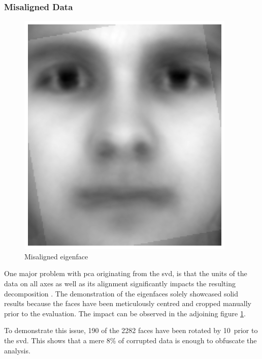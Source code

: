 \subsubsection{Misaligned Data}


\begin{figure}
    \centering
    \includegraphics[width=0.9\linewidth]{external_content/media/rotation/average_face-rotation.png}
    \captionsetup{justification=centering}
    \caption{Misaligned eigenface}
    \label{fig:misalignedEigenface}
\end{figure}

One major problem with \gls{pca} originating from the \gls{svd}, is that the units of the data on all axes as well as its alignment significantly impacts the resulting decomposition \cite{brunton2019data}.
The demonstration of the eigenfaces solely showcased solid results because the faces have been meticulously centred and cropped manually prior to the evaluation.
The impact can be observed in the adjoining figure \ref{fig:misalignedEigenface}.

To demonstrate this issue, 190 of the 2282 faces have been rotated by 10\textdegree\ prior to the \gls{svd}.
This shows that a mere 8\% of corrupted data is enough to obfuscate the analysis.


